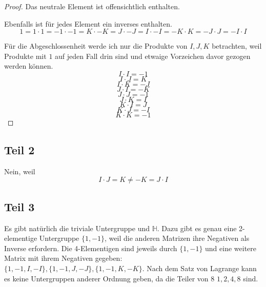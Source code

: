 \documentclass[10pt,a4paper]{article}
\begin{document}
\begin{proof}
  Das neutrale Element ist offensichtlich enthalten.

  Ebenfalls ist für jedes Element ein inverses enthalten.
  \begin{equation}
    1 = 1 \cdot 1 = -1 \cdot -1 = K \cdot -K = J \cdot -J = I \cdot -I = -K \cdot K = -J \cdot J = -I \cdot I
  \end{equation}

  Für die Abgeschlossenheit werde ich nur die Produkte von $I, J, K$ betrachten, weil Produkte mit $1$ auf jeden Fall drin sind und etwaige Vorzeichen davor gezogen werden können.
  \begin{equation}
    I \cdot  I = -1
  \end{equation}
  \begin{equation}
    I \cdot  J = K
  \end{equation}
  \begin{equation}
    I \cdot K = -J
  \end{equation}
  \begin{equation}
    J \cdot I = -K
  \end{equation}
  \begin{equation}
    J \cdot J = -1
  \end{equation}
  \begin{equation}
    J \cdot K = I
  \end{equation}
  \begin{equation}
    K \cdot I = J
  \end{equation}
  \begin{equation}
    K \cdot J = -I
  \end{equation}
  \begin{equation}
    K \cdot K = -1
  \end{equation}
\end{proof}

\subsection{Teil 2}

Nein, weil
\begin{equation}
  I \cdot J = K \ne -K = J \cdot I
\end{equation}

\subsection{Teil 3}

Es gibt natürlich die triviale Untergruppe und $\mathbb{H}$.
Dazu gibt es genau eine 2-elementige Untergruppe $\{ 1, -1 \}$, weil die anderen Matrizen ihre Negativen als Inverse erfordern.
Die 4-Elementigen sind jeweils durch $\{ 1, -1 \}$ und eine weitere Matrix mit ihrem Negativen gegeben: $\{ 1, -1, I, -I \}, \{ 1, -1, J, -J \}, \{ 1, -1, K, -K \}$.
Nach dem Satz von Lagrange kann es keine Untergruppen anderer Ordnung geben, da die Teiler von 8 $1, 2, 4, 8$ sind.
\end{document}
